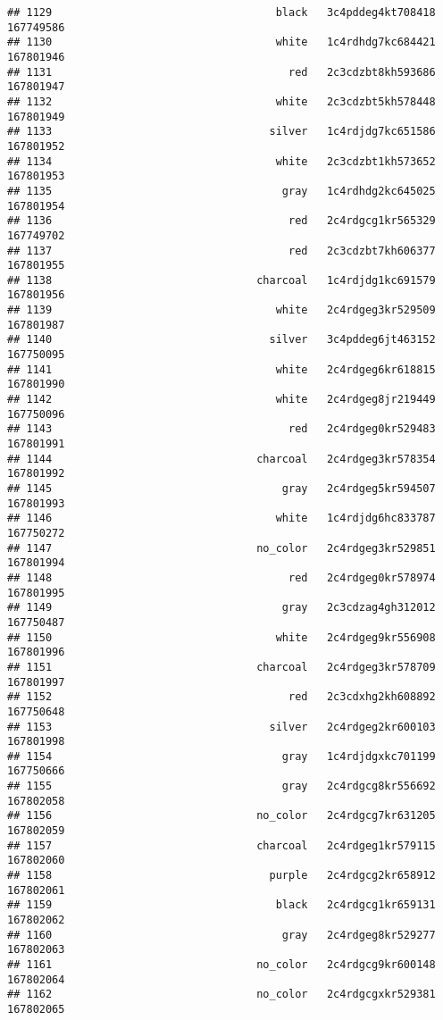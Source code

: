 \documentclass[
]{article}
\begin{document}
\begin{verbatim}
## 1129                                   black   3c4pddeg4kt708418 167749586
## 1130                                   white   1c4rdhdg7kc684421 167801946
## 1131                                     red   2c3cdzbt8kh593686 167801947
## 1132                                   white   2c3cdzbt5kh578448 167801949
## 1133                                  silver   1c4rdjdg7kc651586 167801952
## 1134                                   white   2c3cdzbt1kh573652 167801953
## 1135                                    gray   1c4rdhdg2kc645025 167801954
## 1136                                     red   2c4rdgcg1kr565329 167749702
## 1137                                     red   2c3cdzbt7kh606377 167801955
## 1138                                charcoal   1c4rdjdg1kc691579 167801956
## 1139                                   white   2c4rdgeg3kr529509 167801987
## 1140                                  silver   3c4pddeg6jt463152 167750095
## 1141                                   white   2c4rdgeg6kr618815 167801990
## 1142                                   white   2c4rdgeg8jr219449 167750096
## 1143                                     red   2c4rdgeg0kr529483 167801991
## 1144                                charcoal   2c4rdgeg3kr578354 167801992
## 1145                                    gray   2c4rdgeg5kr594507 167801993
## 1146                                   white   1c4rdjdg6hc833787 167750272
## 1147                                no_color   2c4rdgeg3kr529851 167801994
## 1148                                     red   2c4rdgeg0kr578974 167801995
## 1149                                    gray   2c3cdzag4gh312012 167750487
## 1150                                   white   2c4rdgeg9kr556908 167801996
## 1151                                charcoal   2c4rdgeg3kr578709 167801997
## 1152                                     red   2c3cdxhg2kh608892 167750648
## 1153                                  silver   2c4rdgeg2kr600103 167801998
## 1154                                    gray   1c4rdjdgxkc701199 167750666
## 1155                                    gray   2c4rdgcg8kr556692 167802058
## 1156                                no_color   2c4rdgcg7kr631205 167802059
## 1157                                charcoal   2c4rdgeg1kr579115 167802060
## 1158                                  purple   2c4rdgcg2kr658912 167802061
## 1159                                   black   2c4rdgcg1kr659131 167802062
## 1160                                    gray   2c4rdgeg8kr529277 167802063
## 1161                                no_color   2c4rdgcg9kr600148 167802064
## 1162                                no_color   2c4rdgcgxkr529381 167802065

\end{verbatim}
\end{document}
